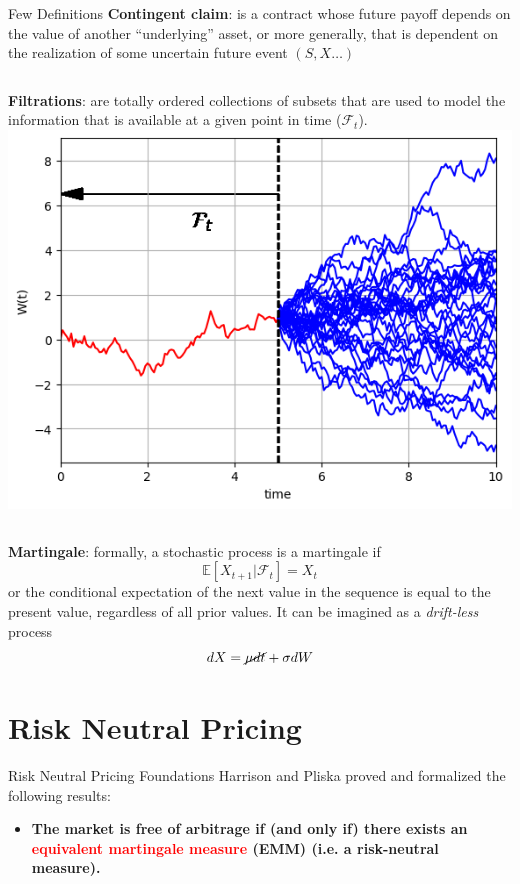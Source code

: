 \documentclass{beamer}
\begin{document}
\begin{frame}{Few Definitions}
		\textbf{Contingent claim}: is a contract whose future payoff depends on the value of another “underlying” asset, or more generally, that is dependent on the realization of some uncertain future event $(S, X\ldots)$
		
		\begin{columns}
			\textbf{Filtrations}: are totally ordered collections of subsets that are used to model the information that is available at a given point in time ($\mathcal{F}_t$). 
				\includegraphics[width=0.8\linewidth]{images/filtration}
		\end{columns}
		
		\textbf{Martingale}: formally, a stochastic process is a martingale if
\begin{equation*} 
\mathbb{E}[X_{t+1}|\mathcal{F}_t] = X_t
\end{equation*}
or the conditional expectation of the next value in the sequence is equal to the present value, regardless of all prior values. 
It can be imagined as a \emph{drift-less} process
		\begin{equation*}
			dX = \cancel{\mu dt} + \sigma dW
		\end{equation*}
	\end{frame}

\section{Risk Neutral Pricing}
\begin{frame}{Risk Neutral Pricing Foundations}
	Harrison and Pliska proved and formalized the following results:
	\begin{itemize}
		\item \textbf{The market is free of arbitrage if (and only if) there exists an \textcolor{red}{equivalent martingale measure} (EMM) (i.e. a risk-neutral measure).}
	\end{itemize}
	\vfill
\end{frame}
\end{document}
